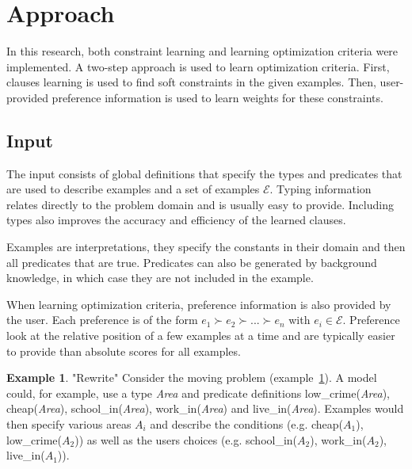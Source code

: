 \documentclass[letterpaper]{article}
\newcommand{\sym}[1]{\ensuremath{\mathcal{#1}}}
\theoremstyle{definition}
\newtheorem{example}{Example}
\begin{document}

\section{Approach}
In this research, both constraint learning and learning optimization criteria were implemented.
A two-step approach is used to learn optimization criteria.
First, clauses learning is used to find soft constraints in the given examples.
Then, user-provided preference information is used to learn weights for these constraints.


\subsection{Input}
The input consists of global definitions that specify the types and predicates that are used to describe examples and a set of examples \sym{E}.
Typing information relates directly to the problem domain and is usually easy to provide.
Including types also improves the accuracy and efficiency of the learned clauses.

Examples are interpretations, they specify the constants in their domain and then all predicates that are true.
Predicates can also be generated by background knowledge, in which case they are not included in the example.

When learning optimization criteria, preference information is also provided by the user.
Each preference is of the form $e_1 \succ e_2 \succ ... \succ e_n$ with $e_i \in \sym{E}$.
Preference look at the relative position of a few examples at a time and are typically easier to provide than absolute scores for all examples.

\begin{example} "Rewrite"
  \label{ex:moving-input}
  Consider the moving problem (example~\ref{ex:moving-input}).
  A model could, for example, use a type \textit{Area} and predicate definitions low\_crime(\textit{Area}), cheap(\textit{Area}), school\_in(\textit{Area}), work\_in(\textit{Area}) and live\_in(\textit{Area}).
  Examples would then specify various areas $A_i$ and describe the conditions (e.g. cheap($A_1$), low\_crime($A_2$)) as well as the users choices (e.g. school\_in($A_2$), work\_in($A_2$), live\_in($A_1$)).
\end{example}
\end{document}
